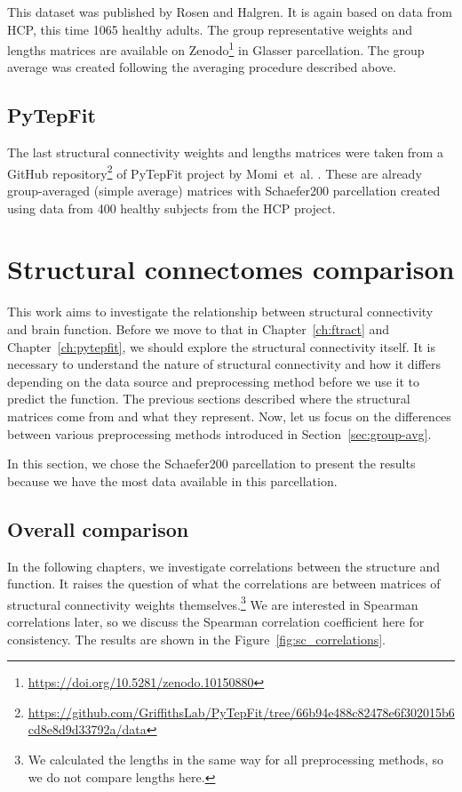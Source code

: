This dataset was published by Rosen and Halgren. \cite{rosen_whole-cortex_2021} It is again based on data from HCP, this time 1065 healthy adults. The group representative weights and lengths matrices are available on Zenodo\footnote{\url{https://doi.org/10.5281/zenodo.10150880}} in Glasser parcellation. The group average was created following the averaging procedure described above. 

\subsection{PyTepFit}\label{sec:pytepdata}

The last structural connectivity weights and lengths matrices were taken from a GitHub repository\footnote{\url{https://github.com/GriffithsLab/PyTepFit/tree/66b94e488c82478e6f302015b6cd8e8d9d33792a/data}} of PyTepFit project by Momi~et~al. \cite{momi_tms-evoked_2023}. These are already group-averaged (simple average) matrices with Schaefer200 parcellation created using data from 400 healthy subjects from the HCP project. 

\section{Structural connectomes comparison}

This work aims to investigate the relationship between structural connectivity and brain function. Before we move to that in Chapter~\ref{ch:ftract} and Chapter~\ref{ch:pytepfit}, we should explore the structural connectivity itself. It is necessary to understand the nature of structural connectivity and how it differs depending on the data source and preprocessing method before we use it to predict the function. The previous sections described where the structural matrices come from and what they represent. Now, let us focus on the differences between various preprocessing methods introduced in Section~\ref{sec:group-avg}.

In this section, we chose the Schaefer200 parcellation to present the results because we have the most data available in this parcellation. 

\subsection{Overall comparison}

In the following chapters, we investigate correlations between the structure and function. It raises the question of what the correlations are between matrices of structural connectivity weights themselves.\footnote{We calculated the lengths in the same way for all preprocessing methods, so we do not compare lengths here.} We are interested in Spearman correlations later, so we discuss the Spearman correlation coefficient here for consistency. The results are shown in the Figure~\ref{fig:sc_correlations}. 

